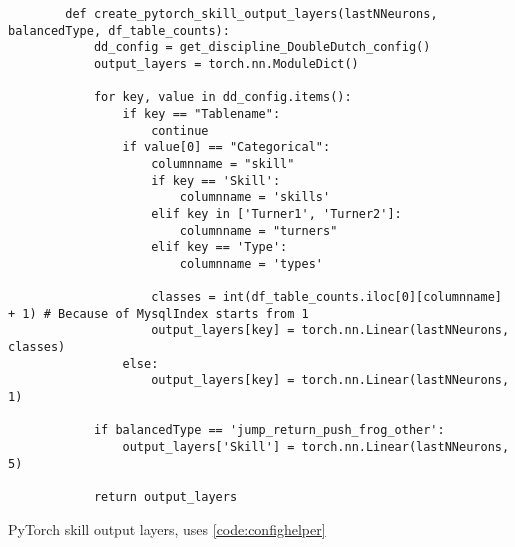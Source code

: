 \begin{listing}
    \begin{verbatim}
        def create_pytorch_skill_output_layers(lastNNeurons, balancedType, df_table_counts):
            dd_config = get_discipline_DoubleDutch_config()
            output_layers = torch.nn.ModuleDict()
            
            for key, value in dd_config.items():
                if key == "Tablename":
                    continue
                if value[0] == "Categorical":
                    columnname = "skill"
                    if key == 'Skill':
                        columnname = 'skills'
                    elif key in ['Turner1', 'Turner2']:
                        columnname = "turners"
                    elif key == 'Type':
                        columnname = 'types'
                    
                    classes = int(df_table_counts.iloc[0][columnname] + 1) # Because of MysqlIndex starts from 1
                    output_layers[key] = torch.nn.Linear(lastNNeurons, classes)
                else:
                    output_layers[key] = torch.nn.Linear(lastNNeurons, 1)
            
            if balancedType == 'jump_return_push_frog_other':
                output_layers['Skill'] = torch.nn.Linear(lastNNeurons, 5)
            
            return output_layers
    \end{verbatim}
    \caption[Pytorch skill output layers]{PyTorch skill output layers, uses \ref{code:confighelper}}
    \label{code:pytorch-skill-output-layers}
\end{listing}

